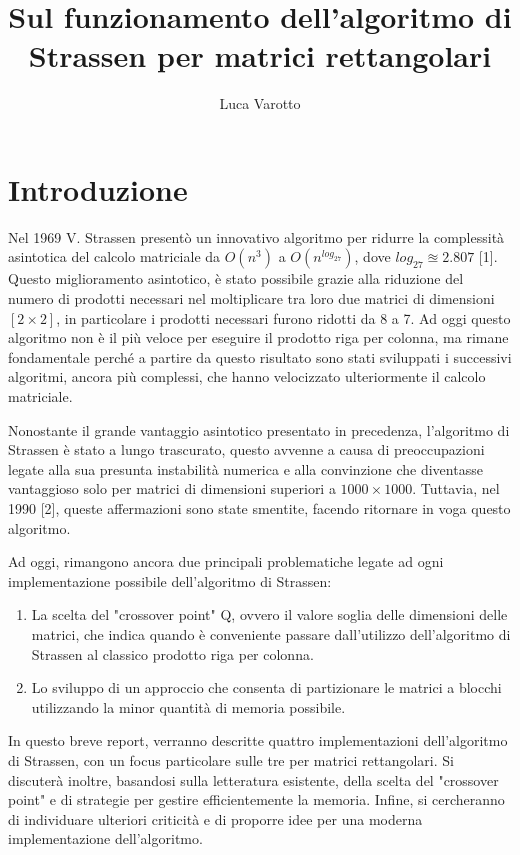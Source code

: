 \documentclass[10pt,a4paper,twoside]{tau-book}
\title{Sul funzionamento dell'algoritmo di Strassen per matrici rettangolari}
\author{Luca Varotto}
\affil{Corso di Laurea in Statistica per le Tecnologie e le Scienze - Esame di Sistemi di Elaborazione 2}
\begin{document}
	
\maketitle

\section{Introduzione}

Nel 1969 V. Strassen presentò un innovativo algoritmo per ridurre la complessità asintotica del calcolo matriciale da $O(n^3)$ a $O(n^{log_27})$, dove $log_27\approxeq2.807$ [1]. Questo miglioramento asintotico, è stato possibile grazie alla riduzione del numero di prodotti necessari nel moltiplicare tra loro due matrici di dimensioni $[2\times 2]$, in particolare i prodotti necessari furono ridotti da 8 a 7. Ad oggi questo algoritmo non è il più veloce per eseguire il prodotto riga per colonna, ma rimane fondamentale perché a partire da questo risultato sono stati sviluppati i successivi algoritmi, ancora più complessi, che hanno velocizzato ulteriormente il calcolo matriciale.

Nonostante il grande vantaggio asintotico presentato in precedenza, l'algoritmo di Strassen è stato a lungo trascurato, questo avvenne a causa di preoccupazioni legate alla sua presunta instabilità numerica e alla convinzione che diventasse vantaggioso solo per matrici di dimensioni superiori a $1000 \times 1000$. Tuttavia, nel 1990 [2], queste affermazioni sono state smentite, facendo ritornare in voga questo algoritmo.

Ad oggi, rimangono ancora due principali problematiche legate ad ogni implementazione possibile dell'algoritmo di Strassen:
\begin{enumerate}
    \item La scelta del "crossover point" Q, ovvero il valore soglia delle dimensioni delle matrici, che indica quando è conveniente passare dall'utilizzo dell'algoritmo di Strassen al classico prodotto riga per colonna.
    \item Lo sviluppo di un approccio che consenta di partizionare le matrici a blocchi utilizzando la minor quantità di memoria possibile.
\end{enumerate}
In questo breve report, verranno descritte quattro implementazioni dell'algoritmo di Strassen, con un focus particolare sulle tre per matrici rettangolari. Si discuterà inoltre, basandosi sulla letteratura esistente, della scelta del "crossover point" e di strategie per gestire efficientemente la memoria. Infine, si cercheranno di individuare ulteriori criticità e di proporre idee per una moderna implementazione dell'algoritmo. \\
\end{document}
